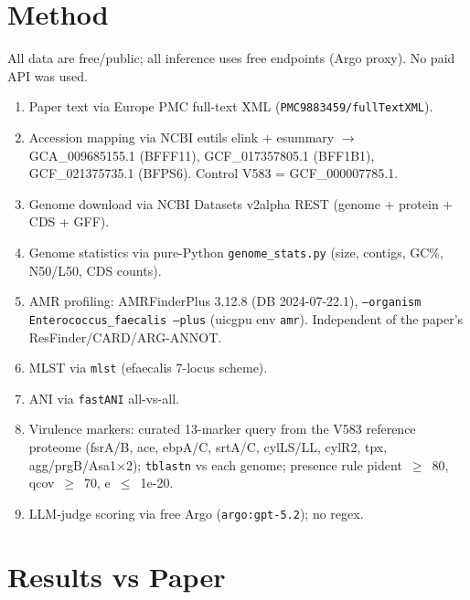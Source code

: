 \documentclass[11pt]{article}
\begin{document}
\section{Method}
All data are free/public; all inference uses free endpoints (Argo proxy). No paid API was used.
\begin{enumerate}
\item Paper text via Europe PMC full-text XML (\texttt{PMC9883459/fullTextXML}).
\item Accession mapping via NCBI eutils elink + esummary $\rightarrow$ GCA\_009685155.1 (BFFF11), GCF\_017357805.1 (BFF1B1), GCF\_021375735.1 (BFPS6). Control V583 = GCF\_000007785.1.
\item Genome download via NCBI Datasets v2alpha REST (genome + protein + CDS + GFF).
\item Genome statistics via pure-Python \texttt{genome\_stats.py} (size, contigs, GC\%, N50/L50, CDS counts).
\item AMR profiling: AMRFinderPlus 3.12.8 (DB 2024-07-22.1), \texttt{--organism Enterococcus\_faecalis --plus} (uicgpu env \texttt{amr}). Independent of the paper's ResFinder/CARD/ARG-ANNOT.
\item MLST via \texttt{mlst} (efaecalis 7-locus scheme).
\item ANI via \texttt{fastANI} all-vs-all.
\item Virulence markers: curated 13-marker query from the V583 reference proteome (fsrA/B, ace, ebpA/C, srtA/C, cylLS/LL, cylR2, tpx, agg/prgB/Asa1$\times$2); \texttt{tblastn} vs each genome; presence rule pident~$\geq$~80, qcov~$\geq$~70, e~$\leq$~1e-20.
\item LLM-judge scoring via free Argo (\texttt{argo:gpt-5.2}); no regex.
\end{enumerate}

\section{Results vs Paper}
\end{document}
